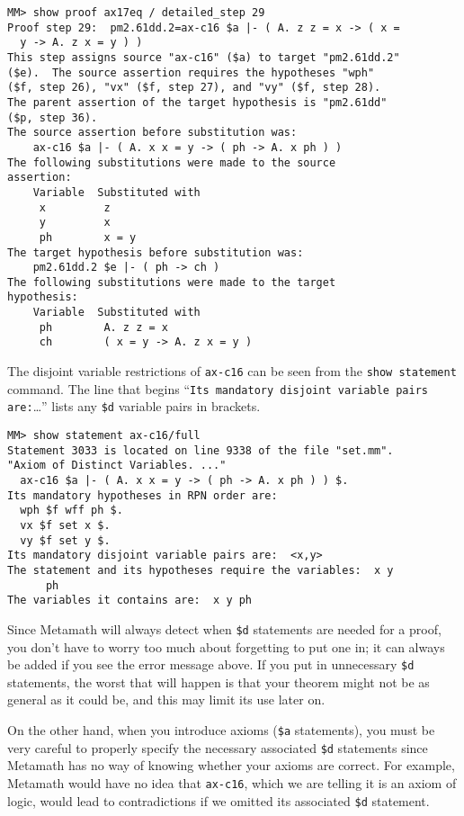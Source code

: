 \begin{verbatim}
MM> show proof ax17eq / detailed_step 29
Proof step 29:  pm2.61dd.2=ax-c16 $a |- ( A. z z = x -> ( x =
  y -> A. z x = y ) )
This step assigns source "ax-c16" ($a) to target "pm2.61dd.2"
($e).  The source assertion requires the hypotheses "wph"
($f, step 26), "vx" ($f, step 27), and "vy" ($f, step 28).
The parent assertion of the target hypothesis is "pm2.61dd"
($p, step 36).
The source assertion before substitution was:
    ax-c16 $a |- ( A. x x = y -> ( ph -> A. x ph ) )
The following substitutions were made to the source
assertion:
    Variable  Substituted with
     x         z
     y         x
     ph        x = y
The target hypothesis before substitution was:
    pm2.61dd.2 $e |- ( ph -> ch )
The following substitutions were made to the target
hypothesis:
    Variable  Substituted with
     ph        A. z z = x
     ch        ( x = y -> A. z x = y )
\end{verbatim}

The disjoint variable restrictions of \texttt{ax-c16} can be seen from the
\texttt{show state\-ment} command.  The line that begins ``\texttt{Its mandatory
dis\-joint var\-i\-able pairs are:}\ldots'' lists any \texttt{\$d} variable
pairs in brackets.

\begin{verbatim}
MM> show statement ax-c16/full
Statement 3033 is located on line 9338 of the file "set.mm".
"Axiom of Distinct Variables. ..."
  ax-c16 $a |- ( A. x x = y -> ( ph -> A. x ph ) ) $.
Its mandatory hypotheses in RPN order are:
  wph $f wff ph $.
  vx $f set x $.
  vy $f set y $.
Its mandatory disjoint variable pairs are:  <x,y>
The statement and its hypotheses require the variables:  x y
      ph
The variables it contains are:  x y ph
\end{verbatim}

Since Metamath will always detect when \texttt{\$d}
statements are needed for a proof, you don't have to worry too much about
forgetting to put one in; it can always be added if you see the error message
above.  If you put in unnecessary \texttt{\$d} statements, the worst that will
happen is that your theorem might not be as general as it could be, and this
may limit its use later on.

On the other hand, when you introduce axioms (\texttt{\$a} statements), you must be very careful to properly specify the
necessary associated \texttt{\$d} statements since Metamath has no way of knowing
whether your axioms are correct.  For example, Metamath would have no idea
that \texttt{ax-c16}, which we are telling it is an axiom of logic, would lead to
contradictions if we omitted its associated \texttt{\$d} statement.

